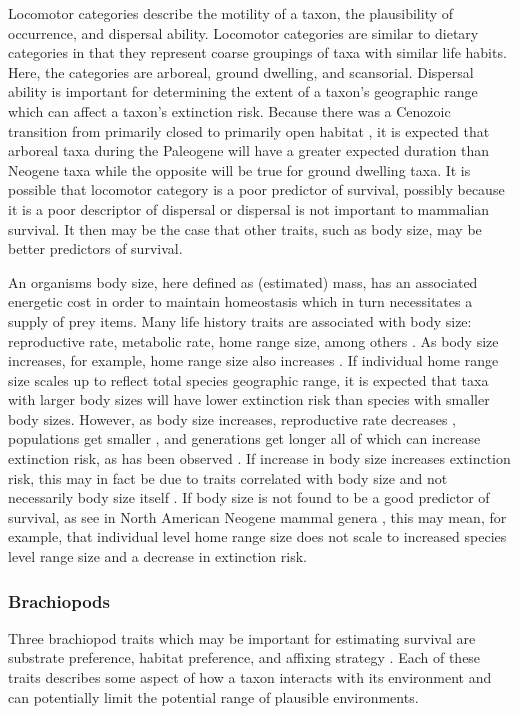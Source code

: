 \documentclass[12pt,letterpaper]{article}
\begin{document}
Locomotor categories describe the motility of a taxon, the plausibility of occurrence, and dispersal ability. Locomotor categories are similar to dietary categories in that they represent coarse groupings of taxa with similar life habits. Here, the categories are arboreal, ground dwelling, and scansorial. Dispersal ability is important for determining the extent of a taxon's geographic range \citep{Birand2012,Jablonski2006a,Gaston2009} which can affect a taxon's extinction risk. Because there was a Cenozoic transition from primarily closed to primarily open habitat \cite{Stromberg2005,Stromberg2013,Janis1993a,Blois2009,Rose2006}, it is expected that arboreal taxa during the Paleogene will have a greater expected duration than Neogene taxa while the opposite will be true for ground dwelling taxa. It is possible that locomotor category is a poor predictor of survival, possibly because it is a poor descriptor of dispersal or dispersal is not important to mammalian survival. It then may be the case that other traits, such as body size, may be better predictors of survival. 

An organisms body size, here defined as (estimated) mass, has an associated energetic cost in order to maintain homeostasis which in turn necessitates a supply of prey items. Many life history traits are associated with body size: reproductive rate, metabolic rate, home range size, among others \cite{Peters1983a,Damuth1979,Brown1987,Smith2004}. As body size increases, for example, home range size also increases \citep{Damuth1979}. If individual home range size scales up to reflect total species geographic range, it is expected that taxa with larger body sizes will have lower extinction risk than species with smaller body sizes. However, as body size increases, reproductive rate decreases \citep{Johnson2002b}, populations get smaller \citep{White2007}, and generations get longer \citep{Martin1993a} all of which can increase extinction risk, as has been observed \citep{Liow2008,Davidson2012}. If increase in body size increases extinction risk, this may in fact be due to traits correlated with body size and not necessarily body size itself \citep{Johnson2002b}. If body size is not found to be a good predictor of survival, as see in North American Neogene mammal genera \citet{Tomiya2013}, this may mean, for example, that individual level home range size does not scale to increased species level range size and a decrease in extinction risk. 

\subsubsection{Brachiopods}
Three brachiopod traits which may be important for estimating survival are substrate preference, habitat preference, and affixing strategy \citep{Alexander1977,Richardson1997,Richardson1997a,Johansen1989}. Each of these traits describes some aspect of how a taxon interacts with its environment and can potentially limit the potential range of plausible environments.
\end{document}
